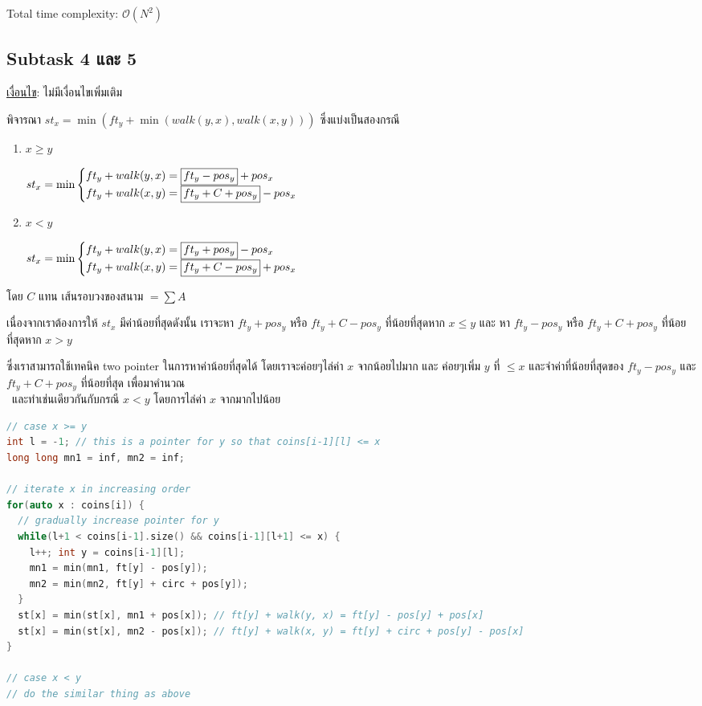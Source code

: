 \documentclass[12pt]{article}
\begin{document}
Total time complexity: $\mathcal{O}(N^2)$

\newpage

\subsection{Subtask 4 และ 5}

\underline{เงื่อนไข}: ไม่มีเงื่อนไขเพิ่มเติม

พิจารณา $st_x = \min(ft_y + \min(walk(y,x), walk(x,y)))$ ซึ่งแบ่งเป็นสองกรณี

\begin{enumerate}[leftmargin=*]
  \item $x \geq y$

  $
  st_x = \min
  \begin{cases}
    ft_y + walk(y, x) = {\setlength{\fboxsep}{2pt}\fbox{$\displaystyle ft_y - pos_y$}} + pos_x \\
    ft_y + walk(x, y) = {\setlength{\fboxsep}{2pt}\fbox{$\displaystyle ft_y + C + pos_y$}} - pos_x
  \end{cases}
  $

  \item $x < y$

  $
  st_x = \min
  \begin{cases}
    ft_y + walk(y, x) = {\setlength{\fboxsep}{2pt}\fbox{$\displaystyle ft_y + pos_y$}} - pos_x \\
    ft_y + walk(x, y) = {\setlength{\fboxsep}{2pt}\fbox{$\displaystyle ft_y + C - pos_y$}} + pos_x
  \end{cases}
  $
\end{enumerate}

โดย $C$ แทน เส้นรอบวงของสนาม $= \sum A$

เนื่องจากเราต้องการให้ $st_x$ มีค่าน้อยที่สุดดังนั้น เราจะหา $ft_y + pos_y$ หรือ $ft_y + C - pos_y$ ที่น้อยที่สุดหาก $x \leq y$ และ หา $ft_y - pos_y$ หรือ $ft_y + C + pos_y$ ที่น้อยที่สุดหาก $x > y$

ซึ่งเราสามารถใช้เทคนิค two pointer ในการหาค่าน้อยที่สุดได้ โดยเราจะค่อยๆไล่ค่า $x$ จากน้อยไปมาก และ ค่อยๆเพิ่ม $y$ ที่ $\leq x$ และจำค่าที่น้อยที่สุดของ $ft_y - pos_y$ และ $ft_y + C + pos_y$ ที่น้อยที่สุด เพื่อมาคำนวณ \\\
และทำเช่นเดียวกันกับกรณี $x<y$ โดยการไล่ค่า $x$ จากมากไปน้อย

\begin{lstlisting}[language=C++]
// case x >= y
int l = -1; // this is a pointer for y so that coins[i-1][l] <= x
long long mn1 = inf, mn2 = inf;

// iterate x in increasing order
for(auto x : coins[i]) {
  // gradually increase pointer for y
  while(l+1 < coins[i-1].size() && coins[i-1][l+1] <= x) {
    l++; int y = coins[i-1][l]; 
    mn1 = min(mn1, ft[y] - pos[y]); 
    mn2 = min(mn2, ft[y] + circ + pos[y]);
  }
  st[x] = min(st[x], mn1 + pos[x]); // ft[y] + walk(y, x) = ft[y] - pos[y] + pos[x]
  st[x] = min(st[x], mn2 - pos[x]); // ft[y] + walk(x, y) = ft[y] + circ + pos[y] - pos[x]
}

// case x < y
// do the similar thing as above
\end{lstlisting}
\end{document}
